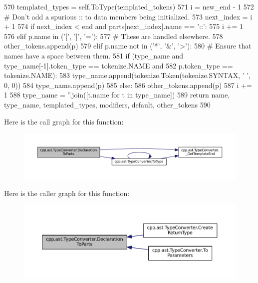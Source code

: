 \begin{DoxyCode}
570                 templated\_types = self.ToType(templated\_tokens)
571                 i = new\_end - 1
572                 \textcolor{comment}{# Don't add a spurious :: to data members being initialized.}
573                 next\_index = i + 1
574                 \textcolor{keywordflow}{if} next\_index < end \textcolor{keywordflow}{and} parts[next\_index].name == \textcolor{stringliteral}{'::'}:
575                     i += 1
576             \textcolor{keywordflow}{elif} p.name \textcolor{keywordflow}{in} (\textcolor{stringliteral}{'['}, \textcolor{stringliteral}{']'}, \textcolor{stringliteral}{'='}):
577                 \textcolor{comment}{# These are handled elsewhere.}
578                 other\_tokens.append(p)
579             \textcolor{keywordflow}{elif} p.name \textcolor{keywordflow}{not} \textcolor{keywordflow}{in} (\textcolor{stringliteral}{'*'}, \textcolor{stringliteral}{'&'}, \textcolor{stringliteral}{'>'}):
580                 \textcolor{comment}{# Ensure that names have a space between them.}
581                 \textcolor{keywordflow}{if} (type\_name \textcolor{keywordflow}{and} type\_name[-1].token\_type == tokenize.NAME \textcolor{keywordflow}{and}
582                     p.token\_type == tokenize.NAME):
583                     type\_name.append(tokenize.Token(tokenize.SYNTAX, \textcolor{stringliteral}{' '}, 0, 0))
584                 type\_name.append(p)
585             \textcolor{keywordflow}{else}:
586                 other\_tokens.append(p)
587             i += 1
588         type\_name = \textcolor{stringliteral}{''}.join([t.name \textcolor{keywordflow}{for} t \textcolor{keywordflow}{in} type\_name])
589         \textcolor{keywordflow}{return} name, type\_name, templated\_types, modifiers, default, other\_tokens
590 
\end{DoxyCode}
Here is the call graph for this function\+:
\nopagebreak
\begin{figure}[H]
\begin{center}
\leavevmode
\includegraphics[width=350pt]{classcpp_1_1ast_1_1TypeConverter_a7c9d20d107c2bc0eb80afdf04957825f_cgraph}
\end{center}
\end{figure}
Here is the caller graph for this function\+:
\nopagebreak
\begin{figure}[H]
\begin{center}
\leavevmode
\includegraphics[width=350pt]{classcpp_1_1ast_1_1TypeConverter_a7c9d20d107c2bc0eb80afdf04957825f_icgraph}
\end{center}
\end{figure}
